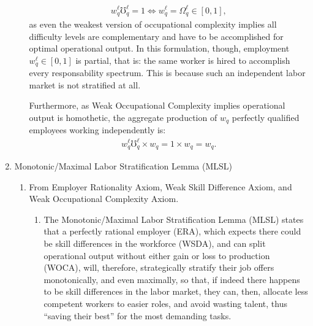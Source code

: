 \documentclass[hidelinks, nonatbib]{elsarticle}
\begin{document}
\begin{enumerate}
\begin{enumerate}
        \begin{gather}
            w_{q}^{\ell}
            \mho_{q}^{\ell}
            =
            1
            \iff
            w_{q}^{\ell}
            =
            \Omega_{q}^{\ell}
            \in [0,1]
            ,
        \end{gather}
        as even the weakest version of occupational complexity implies all difficulty levels are complementary and have to be accomplished for optimal operational output.
        In this formulation, though, employment $w_{q}^{\ell} \in [0,1]$ is partial, that is: the same worker is hired to accomplish every responsability spectrum. This is because such an independent labor market is not stratified at all.

        Furthermore, as Weak Occupational Complexity implies operational output is homothetic, the aggregate production of $w_q$ perfectly qualified employees working independently is:
        \begin{gather}
            w_{q}^{\ell}
            \mho_{q}^{\ell}
            \times
            w_q
            =
            1
            \times
            w_q
            =
            w_q
            .
        \end{gather}
    \end{enumerate}
    \item Monotonic/Maximal Labor Stratification Lemma (MLSL)
    \begin{enumerate}
        \item From Employer Rationality Axiom, Weak Skill Difference Axiom, and Weak Occupational Complexity Axiom.
        \begin{enumerate}
            \item The Monotonic/Maximal Labor Stratification Lemma (MLSL) states that a perfectly rational employer (ERA), which expects there could be skill differences in the workforce (WSDA), and can split operational output without either gain or loss to production (WOCA), will, therefore, strategically stratify their job offers monotonically, and even maximally, so that, if indeed there happens to be skill differences in the labor market, they can, then, allocate less competent workers to easier roles, and avoid wasting talent, thus ``saving their best'' for the most demanding tasks.
            

\end{enumerate}
\end{enumerate}
\end{enumerate}
\end{document}

